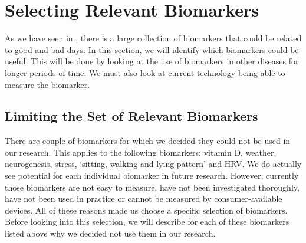 
\section{Selecting Relevant Biomarkers} \label{section:Selecting Relevant Biomarkers}
As we have seen in , there is a large collection of biomarkers that could be related to good and bad days. In this section, we will identify which biomarkers could be useful. 
This will be done by looking at the use of biomarkers in other diseases for longer periods of time. 
We must also look at current technology being able to measure the biomarker.

\subsection{Limiting the Set of Relevant Biomarkers}
There are couple of biomarkers for which we decided they could not be used in our research.
This applies to the following biomarkers: vitamin D, weather, neurogenesis, stress, `sitting, walking and lying pattern' and HRV.
We do actually see potential for each individual biomarker in future research.
However, currently those biomarkers are not easy to measure, have not been investigated thoroughly, have not been used in practice or cannot be measured by consumer-available devices.
All of these reasons made us choose a specific selection of biomarkers.
Before looking into this selection, we will describe for each of these biomarkers listed above why we decided not use them in our research.
%
